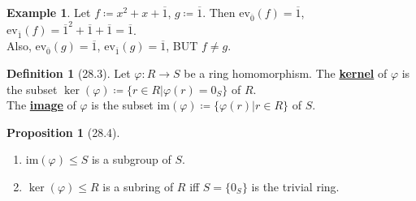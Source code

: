 \documentclass{article}
\newcommand{\coleq}{\coloneqq}
\newcommand{\define}[1]{\textbf{\underline{#1}}}
\newcommand{\func}[3]{#1: #2 \to #3}
\theoremstyle{definition}
\newtheorem*{defn}{Definition}
\newtheorem*{prop}{Proposition}
\newtheorem*{ex}{Example}
\theoremstyle{remark}
\newcommand{\im}{\mathrm{im}}
\newcommand{\ev}{\mathrm{ev}}
\begin{document}
{{\begin{ex}
                \noindent Let $f\coleq x^2+x+\overline{1}$, $g\coleq \overline{1}$. Then $\ev_{\overline{0}}(f)=\overline{1}$, $\ev_{\overline{1}}(f)=\overline{1}^2+\overline{1}+\overline{1}=\overline{1}$.\\
                Also, $\ev_{\overline{0}}(g)=\overline{1}$, $\ev_{\overline{1}}(g)=\overline{1}$, BUT $f\neq g$.
            \end{ex}
            
            \begin{defn}[28.3]
                Let $\func{\varphi}{R}{S}$ be a ring homomorphism. The \define{kernel} of $\varphi$ is the subset $\ker(\varphi)\coleq\{r\in R|\varphi(r)=0_S\}$ of $R$.\\
                The \define{image} of $\varphi$ is the subset $\im(\varphi)\coleq\{\varphi(r)|r \in R\}$ of $S$.
            \end{defn}
            
            \begin{prop}[28.4]
                \begin{enumerate}
                    \item $\im(\varphi)\leq S$ is a subgroup of $S$.
                    \item $\ker(\varphi)\leq R$ is a subring of $R$ iff $S=\{0_S\}$ is the trivial ring.
                \end{enumerate}
            \end{prop}
            
        }
    }
\end{document}
